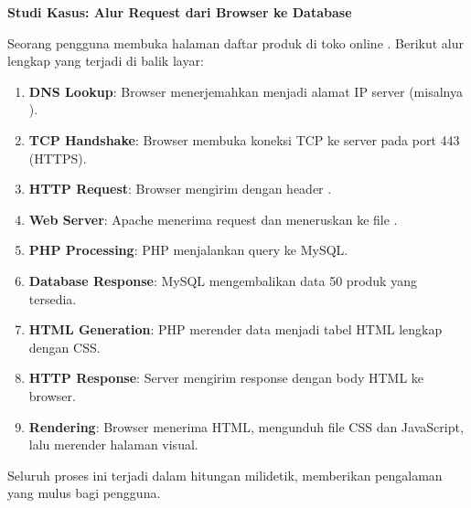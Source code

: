 \begin{contoh}
\textbf{Studi Kasus: Alur Request dari Browser ke Database}

\begin{sloppypar}
Seorang pengguna membuka halaman daftar produk di toko online . Berikut alur lengkap yang terjadi di balik layar:
\end{sloppypar}

\begin{enumerate}
  \item \textbf{DNS Lookup}: Browser menerjemahkan  menjadi alamat IP server (misalnya ).
  \item \textbf{TCP Handshake}: Browser membuka koneksi TCP ke server pada port 443 (HTTPS).
  \item \textbf{HTTP Request}: Browser mengirim  dengan header .
  \item \textbf{Web Server}: Apache menerima request dan meneruskan ke file .
  \item \textbf{PHP Processing}: PHP menjalankan query  ke MySQL.
  \item \textbf{Database Response}: MySQL mengembalikan data 50 produk yang tersedia.
  \item \textbf{HTML Generation}: PHP merender data menjadi tabel HTML lengkap dengan CSS.
  \item \textbf{HTTP Response}: Server mengirim response  dengan body HTML ke browser.
  \item \textbf{Rendering}: Browser menerima HTML, mengunduh file CSS dan JavaScript, lalu merender halaman visual.
\end{enumerate}

Seluruh proses ini terjadi dalam hitungan milidetik, memberikan pengalaman yang mulus bagi pengguna.
\end{contoh}

